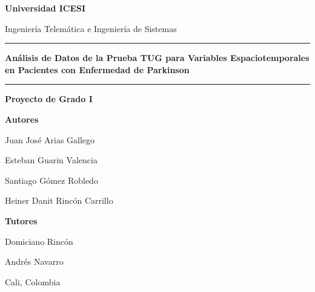 \documentclass[12pt,a4paper]{article}
\begin{document}
\begin{titlepage}
  \thispagestyle{empty}
  \centering
  \singlespacing
  \vspace*{0.5cm}

  {\Large\bfseries Universidad ICESI\par}
  \vspace{0.4cm}
  {\large Ingeniería Telemática e Ingeniería de Sistemas\par}

  \vspace{1.4cm}
  \rule{\textwidth}{1.2pt}\par
  \vspace{0.6cm}
  {\LARGE\bfseries\color{icesi}
   Análisis de Datos de la Prueba TUG para Variables Espaciotemporales en
   Pacientes con Enfermedad de Parkinson\par}
  \vspace{0.6cm}
  \rule{\textwidth}{1.2pt}\par

  \vspace{1.2cm}
  {\Large\bfseries Proyecto de Grado I\par}

  \vspace{1.2cm}
  {\large\bfseries Autores\par}
  \vspace{0.3cm}
  {\large
   Juan José Arias Gallego\par
   Esteban Guarin Valencia\par
   Santiago Gómez Robledo\par
   Heiner Danit Rincón Carrillo\par}
   
  \vspace{0.7cm}
  {\large\bfseries Tutores\par}
  \vspace{0.3cm}
  {\large
   Domiciano Rincón\par
   Andrés Navarro\par}

  \vfill
  {\large Cali, Colombia\par}
\end{titlepage}

\tableofcontents
\newpage
\end{document}
